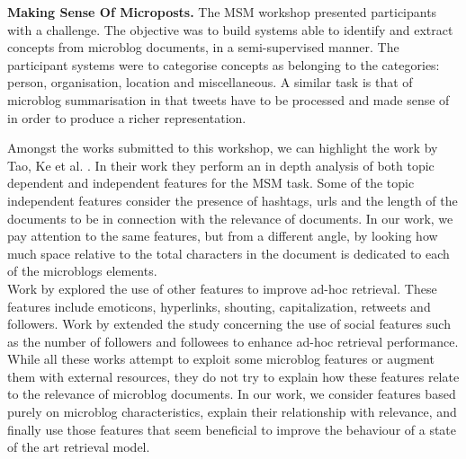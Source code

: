 
\noindent \textbf{Making Sense Of Microposts.} The MSM workshop \cite{basave2013making} presented participants with a challenge. The objective was to build systems able to identify and extract concepts from microblog documents, in a semi-supervised manner. The participant systems were to categorise concepts as belonging to the categories: person, organisation, location and miscellaneous. A similar task is that of microblog summarisation \cite{5590862} in that tweets have to be processed and made sense of in order to produce a richer representation.

Amongst the works submitted to this workshop, we can highlight the work by Tao, Ke et al. \cite{tao2012makes}. In their work they perform an in depth analysis of both topic dependent and independent features for the MSM task. Some of the topic independent features consider the presence of hashtags, urls and the length of the documents to be in connection with the relevance of documents. In our work, we pay attention to the same features, but from a different angle, by looking how much space relative to the total characters in the document is dedicated to each of the microblogs elements. \\


Work by \cite{massoudi2011incorporating} explored the use of other features to improve ad-hoc retrieval. These features include emoticons, hyperlinks, shouting, capitalization, retweets and followers. 
Work by \cite{nagmoti2010ranking} extended the study concerning the use of social features such as the number of followers and followees to enhance ad-hoc retrieval performance.
While all these works attempt to exploit some microblog features or augment them with external resources, they do not try to explain how these features relate to the relevance of microblog documents. In our work, we consider features based purely on microblog characteristics, explain their relationship with relevance, and finally use those features that seem beneficial to improve the behaviour of a state of the art retrieval model.
